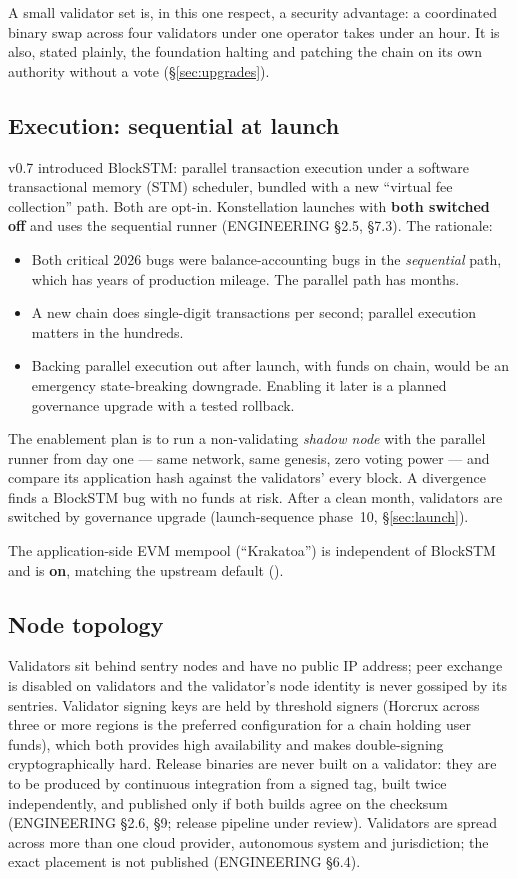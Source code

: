 A small validator set is, in this one respect, a security advantage: a
coordinated binary swap across four validators under one operator takes under an
hour. It is also, stated plainly, the foundation halting and patching the
chain on its own authority without a vote (\S\ref{sec:upgrades}).

\subsection{Execution: sequential at launch}
\label{sec:blockstm}

 v0.7 introduced BlockSTM: parallel transaction execution
under a software transactional memory (STM) scheduler, bundled with a new
``virtual fee collection'' path. Both are opt-in. Konstellation launches with
\textbf{both switched off} and uses the sequential runner (ENGINEERING \S2.5,
\S7.3). The rationale:

\begin{itemize}
\item Both critical 2026 bugs were balance-accounting bugs in the
  \emph{sequential} path, which has years of production mileage. The parallel
  path has months.
\item A new chain does single-digit transactions per second; parallel execution
  matters in the hundreds.
\item Backing parallel execution out after launch, with funds on chain, would be
  an emergency state-breaking downgrade. Enabling it later is a planned
  governance upgrade with a tested rollback.
\end{itemize}

The enablement plan is to run a non-validating \emph{shadow node} with the
parallel runner from day one --- same network, same genesis, zero voting power ---
and compare its application hash against the validators' every block. A
divergence finds a BlockSTM bug with no funds at risk. After a clean month,
validators are switched by governance upgrade (launch-sequence phase~10,
\S\ref{sec:launch}).

The application-side EVM mempool (``Krakatoa'') is independent of BlockSTM and
is \textbf{on}, matching the upstream default ().

\subsection{Node topology}

Validators sit behind sentry nodes and have no public IP address; peer exchange
is disabled on validators and the validator's node identity is never gossiped
by its sentries. Validator signing keys are held by threshold signers
(Horcrux across three or more regions is the preferred configuration for a chain
holding user funds), which both provides high availability and makes
double-signing cryptographically hard. Release binaries are never built on a
validator: they are to be produced by continuous integration from a signed
tag, built twice independently, and published only if both builds agree on
the checksum (ENGINEERING \S2.6, \S9; release pipeline under review).
Validators are spread across more than one cloud provider, autonomous system
and jurisdiction; the exact placement is not published (ENGINEERING \S6.4).
